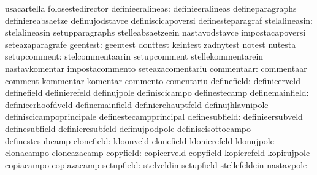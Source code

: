                                   usacartella                      folosestedirector %
                definieeralineas: definieeralineas                 defineparagraphs
                                  definiereabsaetze                definujodstavce
                                  definiscicapoversi               definesteparagraf
                   stelalineasin: stelalineasin                    setupparagraphs
                                  stelleabsaetzeein                nastavodstavce
                                  impostacapoversi                 seteazaparagrafe
                        geentest: geentest                         donttest
                                  keintest                         zadnytest
                                  notest                           nutesta
                    setupcomment: stelcommentaarin                 setupcomment
                                  stellekommentarein               nastavkomentar
                                  impostacommento                  seteazacomentariu
                      commentaar: commentaar                       comment
                                  kommentar                        komentar
                                  commento                         comentariu
                     definefield: definieerveld                    definefield
                                  definierefeld                    definujpole
                                  definiscicampo                   definestecamp
                 definemainfield: definieerhoofdveld               definemainfield
                                  definierehauptfeld               definujhlavnipole
                                  definiscicampoprincipale         definestecampprincipal
                  definesubfield: definieersubveld                 definesubfield
                                  definieresubfeld                 definujpodpole
                                  definiscisottocampo              definestesubcamp
                      clonefield: kloonveld                        clonefield
                                  klonierefeld                     klonujpole
                                  clonacampo                       cloneazacamp
                       copyfield: copieerveld                      copyfield
                                  kopierefeld                      kopirujpole
                                  copiacampo                       copiazacamp
                      setupfield: stelveldin                       setupfield
                                  stellefeldein                    nastavpole
